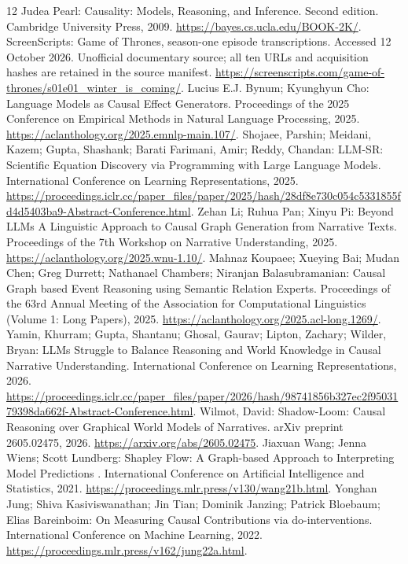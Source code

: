 \documentclass{svproc}
\begin{document}
\clearpage
\begin{thebibliography}{12}
 Judea Pearl: Causality: Models, Reasoning, and Inference. Second edition. Cambridge University Press, 2009. \url{https://bayes.cs.ucla.edu/BOOK-2K/}.
 ScreenScripts: Game of Thrones, season-one episode transcriptions. Accessed 12 October 2026. Unofficial documentary source; all ten URLs and acquisition hashes are retained in the source manifest. \url{https://screenscripts.com/game-of-thrones/s01e01_winter_is_coming/}.
 Lucius E.J. Bynum; Kyunghyun Cho: Language Models as Causal Effect Generators. Proceedings of the 2025 Conference on Empirical Methods in Natural Language Processing, 2025. \url{https://aclanthology.org/2025.emnlp-main.107/}.
 Shojaee, Parshin; Meidani, Kazem; Gupta, Shashank; Barati Farimani, Amir; Reddy, Chandan: LLM-SR: Scientific Equation Discovery via Programming with Large Language Models. International Conference on Learning Representations, 2025. \url{https://proceedings.iclr.cc/paper_files/paper/2025/hash/28df8e730c054c5331855fd4d5403ba9-Abstract-Conference.html}.
 Zehan Li; Ruhua Pan; Xinyu Pi: Beyond LLMs A Linguistic Approach to Causal Graph Generation from Narrative Texts. Proceedings of the 7th Workshop on Narrative Understanding, 2025. \url{https://aclanthology.org/2025.wnu-1.10/}.
 Mahnaz Koupaee; Xueying Bai; Mudan Chen; Greg Durrett; Nathanael Chambers; Niranjan Balasubramanian: Causal Graph based Event Reasoning using Semantic Relation Experts. Proceedings of the 63rd Annual Meeting of the Association for Computational Linguistics (Volume 1: Long Papers), 2025. \url{https://aclanthology.org/2025.acl-long.1269/}.
 Yamin, Khurram; Gupta, Shantanu; Ghosal, Gaurav; Lipton, Zachary; Wilder, Bryan: LLMs Struggle to Balance Reasoning and World Knowledge in Causal Narrative Understanding. International Conference on Learning Representations, 2026. \url{https://proceedings.iclr.cc/paper_files/paper/2026/hash/98741856b327ec2f9503179398da662f-Abstract-Conference.html}.
 Wilmot, David: Shadow-Loom: Causal Reasoning over Graphical World Models of Narratives. arXiv preprint 2605.02475, 2026. \url{https://arxiv.org/abs/2605.02475}.
 Jiaxuan Wang; Jenna Wiens; Scott Lundberg:  Shapley Flow: A Graph-based Approach to Interpreting Model Predictions . International Conference on Artificial Intelligence and Statistics, 2021. \url{https://proceedings.mlr.press/v130/wang21b.html}.
 Yonghan Jung; Shiva Kasiviswanathan; Jin Tian; Dominik Janzing; Patrick Bloebaum; Elias Bareinboim: On Measuring Causal Contributions via do-interventions. International Conference on Machine Learning, 2022. \url{https://proceedings.mlr.press/v162/jung22a.html}.

\end{thebibliography}
\end{document}
